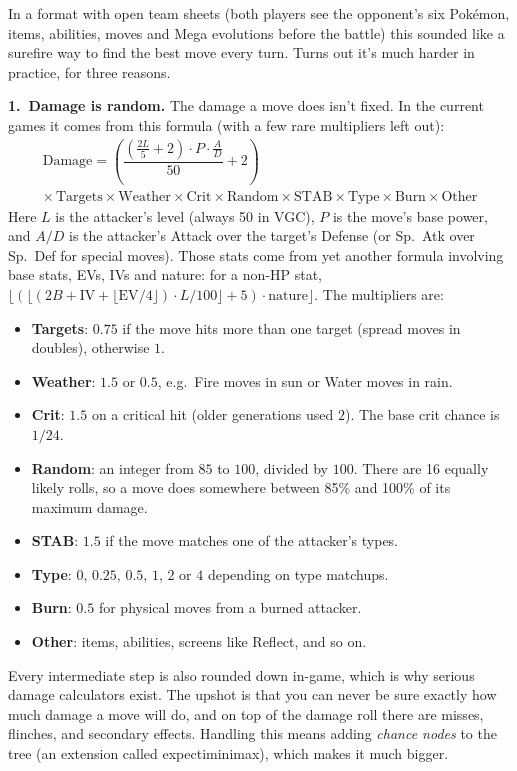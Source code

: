 \documentclass[11pt,a4paper]{article}
\begin{document}
In a format with open team sheets (both players see the opponent's six Pok\'emon, items, abilities, moves and Mega evolutions before the battle) this sounded like a surefire way to find the best move every turn. Turns out it's much harder in practice, for three reasons.

\textbf{1.\ Damage is random.} The damage a move does isn't fixed. In the current games it comes from this formula (with a few rare multipliers left out):
\begin{multline*}
\text{Damage} = \left(\dfrac{\left(\frac{2L}{5}+2\right)\cdot P\cdot \frac{A}{D}}{50}+2\right)\\
\times\, \text{Targets}\times\text{Weather}\times\text{Crit}\times\text{Random}\times\text{STAB}\times\text{Type}\times\text{Burn}\times\text{Other}
\end{multline*}
Here $L$ is the attacker's level (always 50 in VGC), $P$ is the move's base power, and $A/D$ is the attacker's Attack over the target's Defense (or Sp.\ Atk over Sp.\ Def for special moves). Those stats come from yet another formula involving base stats, EVs, IVs and nature: for a non-HP stat, $\lfloor(\lfloor(2B+\text{IV}+\lfloor\text{EV}/4\rfloor)\cdot L/100\rfloor+5)\cdot\text{nature}\rfloor$. The multipliers are:
\begin{itemize}\setlength\itemsep{0pt}
\item \textbf{Targets}: $0.75$ if the move hits more than one target (spread moves in doubles), otherwise $1$.
\item \textbf{Weather}: $1.5$ or $0.5$, e.g.\ Fire moves in sun or Water moves in rain.
\item \textbf{Crit}: $1.5$ on a critical hit (older generations used $2$). The base crit chance is $1/24$.
\item \textbf{Random}: an integer from $85$ to $100$, divided by $100$. There are 16 equally likely rolls, so a move does somewhere between 85\% and 100\% of its maximum damage.
\item \textbf{STAB}: $1.5$ if the move matches one of the attacker's types.
\item \textbf{Type}: $0$, $0.25$, $0.5$, $1$, $2$ or $4$ depending on type matchups.
\item \textbf{Burn}: $0.5$ for physical moves from a burned attacker.
\item \textbf{Other}: items, abilities, screens like Reflect, and so on.
\end{itemize}
Every intermediate step is also rounded down in-game, which is why serious damage calculators exist. The upshot is that you can never be sure exactly how much damage a move will do, and on top of the damage roll there are misses, flinches, and secondary effects. Handling this means adding \emph{chance nodes} to the tree (an extension called expectiminimax), which makes it much bigger.
\end{document}

